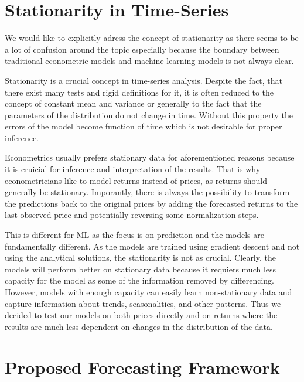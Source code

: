 \section{Stationarity in Time-Series}

We would like to explicitly adress the concept of stationarity as there 
seems to be a lot of confusion around the topic especially because the boundary between 
traditional econometric models and machine learning models is not always clear.

Stationarity is a crucial concept in time-series analysis. Despite the fact, that there exist
many tests and rigid definitions for it, it is often reduced to the 
concept of constant mean and variance or generally to the fact that the parameters
of the distribution do not change in time. Without this property the errors
of the model become function of time which is not desirable for proper inference.

Econometrics usually prefers stationary data for aforementioned reasons because it 
is cruicial for inference and interpretation of the results. That is 
why econometricians like to model returns instead of prices, as returns
should generally be stationary. Imporantly, there is always the possibility
to transform the predictions back to the original prices by adding the forecasted
returns to the last observed price and potentially reversing some normalization steps.

This is different for \ac{ML} as the focus is on prediction and the models are fundamentally 
different. As the models are trained using gradient descent and not using the
analytical solutions, the stationarity is not as crucial. Clearly, 
the models will perform better on stationary data because it requiers much 
less capacity for the model as some of the information removed by differencing.
However, models with enough capacity can easily learn non-stationary data and
capture information about trends, seasonalities, and other patterns. 
Thus we decided to test our models on both prices directly and on returns where
the results are much less dependent on changes in the distribution of the data.

\section{Proposed Forecasting Framework}


